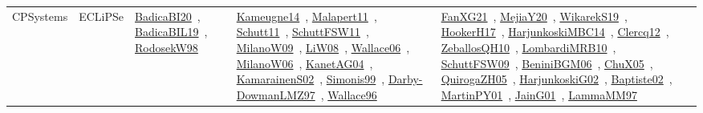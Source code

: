 {\begin{longtable}{lp{3cm}>{\raggedright\arraybackslash}p{6cm}>{\raggedright\arraybackslash}p{6cm}>{\raggedright\arraybackslash}p{8cm}}
CPSystems & ECLiPSe & \href{works/BadicaBI20.pdf}{BadicaBI20}~\cite{BadicaBI20}, \href{works/BadicaBIL19.pdf}{BadicaBIL19}~\cite{BadicaBIL19}, \href{works/RodosekW98.pdf}{RodosekW98}~\cite{RodosekW98} & \href{works/Kameugne14.pdf}{Kameugne14}~\cite{Kameugne14}, \href{works/Malapert11.pdf}{Malapert11}~\cite{Malapert11}, \href{works/Schutt11.pdf}{Schutt11}~\cite{Schutt11}, \href{works/SchuttFSW11.pdf}{SchuttFSW11}~\cite{SchuttFSW11}, \href{works/MilanoW09.pdf}{MilanoW09}~\cite{MilanoW09}, \href{works/LiW08.pdf}{LiW08}~\cite{LiW08}, \href{works/Wallace06.pdf}{Wallace06}~\cite{Wallace06}, \href{works/MilanoW06.pdf}{MilanoW06}~\cite{MilanoW06}, \href{works/KanetAG04.pdf}{KanetAG04}~\cite{KanetAG04}, \href{works/KamarainenS02.pdf}{KamarainenS02}~\cite{KamarainenS02}, \href{works/Simonis99.pdf}{Simonis99}~\cite{Simonis99}, \href{works/Darby-DowmanLMZ97.pdf}{Darby-DowmanLMZ97}~\cite{Darby-DowmanLMZ97}, \href{works/Wallace96.pdf}{Wallace96}~\cite{Wallace96} & \href{works/FanXG21.pdf}{FanXG21}~\cite{FanXG21}, \href{works/MejiaY20.pdf}{MejiaY20}~\cite{MejiaY20}, \href{works/WikarekS19.pdf}{WikarekS19}~\cite{WikarekS19}, \href{works/HookerH17.pdf}{HookerH17}~\cite{HookerH17}, \href{works/HarjunkoskiMBC14.pdf}{HarjunkoskiMBC14}~\cite{HarjunkoskiMBC14}, \href{works/Clercq12.pdf}{Clercq12}~\cite{Clercq12}, \href{works/ZeballosQH10.pdf}{ZeballosQH10}~\cite{ZeballosQH10}, \href{works/LombardiMRB10.pdf}{LombardiMRB10}~\cite{LombardiMRB10}, \href{works/SchuttFSW09.pdf}{SchuttFSW09}~\cite{SchuttFSW09}, \href{works/BeniniBGM06.pdf}{BeniniBGM06}~\cite{BeniniBGM06}, \href{works/ChuX05.pdf}{ChuX05}~\cite{ChuX05}, \href{works/QuirogaZH05.pdf}{QuirogaZH05}~\cite{QuirogaZH05}, \href{works/HarjunkoskiG02.pdf}{HarjunkoskiG02}~\cite{HarjunkoskiG02}, \href{works/Baptiste02.pdf}{Baptiste02}~\cite{Baptiste02}, \href{works/MartinPY01.pdf}{MartinPY01}~\cite{MartinPY01}, \href{works/JainG01.pdf}{JainG01}~\cite{JainG01}, \href{works/LammaMM97.pdf}{LammaMM97}~\cite{LammaMM97}\\

\end{longtable}}
